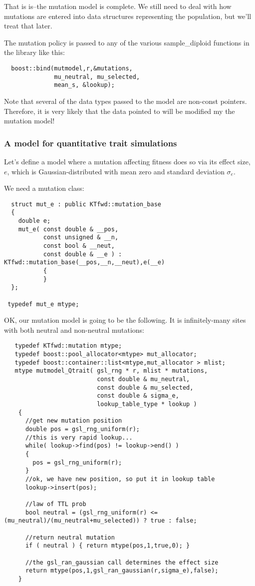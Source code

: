 \documentclass{article}
\begin{document}
That is is--the mutation model is complete.  We still need to deal with how mutations are entered into data structures representing the population, but we'll treat that later.

The mutation policy is passed to any of the various sample\_diploid functions in the library like this:

\begin{lstlisting}
  boost::bind(mutmodel,r,&mutations,
              mu_neutral, mu_selected,
              mean_s, &lookup);
\end{lstlisting}

Note that several of the data types passed to the model are non-const pointers.  Therefore, it is very likely that the data pointed to will be modified my the mutation model!

\subsubsection{A model for quantitative trait simulations}
Let's define a model where a mutation affecting fitness does so via its effect size, $e$, which is Gaussian-distributed with mean zero and standard deviation $\sigma_e$.

We need a mutation class:
\begin{lstlisting}
  struct mut_e : public KTfwd::mutation_base
  {
    double e;
    mut_e( const double & __pos,
           const unsigned & __n,
           const bool & __neut,
           const double & __e ) : KTfwd::mutation_base(__pos,__n,__neut),e(__e)
           {
           }
  };

 typedef mut_e mtype;
\end{lstlisting}

OK, our mutation model is going to be the following.  It is infinitely-many sites with both neutral and non-neutral mutations:
\begin{lstlisting}
   typedef KTfwd::mutation mtype;
   typedef boost::pool_allocator<mtype> mut_allocator;
   typedef boost::container::list<mtype,mut_allocator > mlist;
   mtype mutmodel_Qtrait( gsl_rng * r, mlist * mutations,
                          const double & mu_neutral,
                          const double & mu_selected,
                          const double & sigma_e,
                          lookup_table_type * lookup )
    {
      //get new mutation position
      double pos = gsl_rng_uniform(r);
      //this is very rapid lookup...
      while( lookup->find(pos) != lookup->end() )
      {
        pos = gsl_rng_uniform(r);
      }
      //ok, we have new position, so put it in lookup table
      lookup->insert(pos);

      //law of TTL prob
      bool neutral = (gsl_rng_uniform(r) <= (mu_neutral)/(mu_neutral+mu_selected)) ? true : false;

      //return neutral mutation
      if ( neutral ) { return mtype(pos,1,true,0); }

      //the gsl_ran_gaussian call determines the effect size
      return mtype(pos,1,gsl_ran_gaussian(r,sigma_e),false);
    }
\end{lstlisting}
\end{document}
